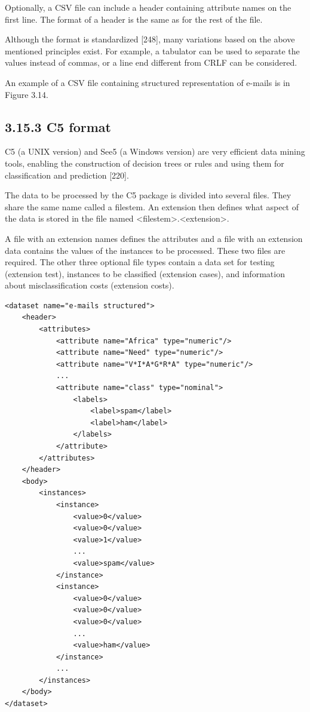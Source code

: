 \documentclass[10pt]{book}
\begin{document}
Optionally, a CSV file can include a header containing attribute names on the first line. The format of a header is the same as for the rest of the file.

Although the format is standardized [248], many variations based on the above mentioned principles exist. For example, a tabulator can be used to separate the values instead of commas, or a line end different from CRLF can be considered.

An example of a CSV file containing structured representation of e-mails is in Figure 3.14.

\subsection*{3.15.3 C5 format}
C5 (a UNIX version) and See5 (a Windows version) are very efficient data mining tools, enabling the construction of decision trees or rules and using them for classification and prediction [220].

The data to be processed by the C5 package is divided into several files. They share the same name called a filestem. An extension then defines what aspect of the data is stored in the file named <filestem>.<extension>.

A file with an extension names defines the attributes and a file with an extension data contains the values of the instances to be processed. These two files are required. The other three optional file types contain a data set for testing (extension test), instances to be classified (extension cases), and information about misclassification costs (extension costs).

\begin{verbatim}
<dataset name="e-mails structured">
    <header>
        <attributes>
            <attribute name="Africa" type="numeric"/>
            <attribute name="Need" type="numeric"/>
            <attribute name="V*I*A*G*R*A" type="numeric"/>
            ...
            <attribute name="class" type="nominal">
                <labels>
                    <label>spam</label>
                    <label>ham</label>
                </labels>
            </attribute>
        </attributes>
    </header>
    <body>
        <instances>
            <instance>
                <value>0</value>
                <value>0</value>
                <value>1</value>
                ...
                <value>spam</value>
            </instance>
            <instance>
                <value>0</value>
                <value>0</value>
                <value>0</value>
                ...
                <value>ham</value>
            </instance>
            ...
        </instances>
    </body>
</dataset>
\end{verbatim}
\end{document}
